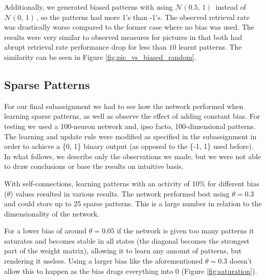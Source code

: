 \documentclass[a4paper]{article}
\begin{document}
Additionally, we generated biased patterns with using $\mathcal{N}(0.5,\,1)\,$ instead of $\mathcal{N}(0,\,1)\,$, so the patterns had more 1's than -1's. The observed retrieval rate was drastically worse compared to the former case where no bias was used. The results were very similar to observed measures for pictures in that both had abrupt retrieval rate performance drop for less than $10$ learnt patterns. The similarity can be seen in Figure \ref{fig:pic_vs_biased_random}. %

\subsection{Sparse Patterns}
For our final subassignment we had to see how the network performed when learning sparse patterns, as well as observe the effect of adding constant bias. For testing we used a 100-neuron network and, ipso facto, 100-dimensional patterns. The learning and update rule were modified as specified in the subassignment in order to achieve a \{0, 1\} binary output (as opposed to the \{-1, 1\} used before). In what follows, we describe only the observations we made, but we were not able to draw conclusions or base the results on intuitive basis.

With self-connections, learning patterns with an activity of 10\% for different bias ($\theta$) values resulted in various results. The network performed best using $\theta = 0.3$ and could store up to 25 sparse patterns. This is a large number in relation to the dimensionality of the network.

For a lower bias of around $\theta = 0.05$ if the network is given too many patterns it saturates and becomes stable in all states (the diagonal becomes the strongest part of the weight matrix), allowing it to learn any amount of patterns, but rendering it useless. Using a larger bias like the aforementioned $\theta = 0.3$ doesn't allow this to happen as the bias drags everything into 0 (Figure \ref{fig:saturation}).
\end{document}

